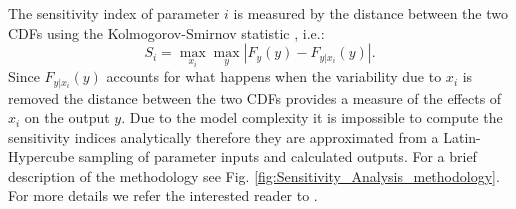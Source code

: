 \documentclass[gmd, manuscript]{copernicus}
\begin{document}
The sensitivity index of parameter $i$ is measured by the distance between the two CDFs using the Kolmogorov-Smirnov statistic 
\citep{kolmogorov1933sulla, smirnov1939estimation}, i.e.:
\begin{equation}
 S_i = \max_{x_i} \max_{y} | F_y(y) - F_{y|x_i}(y) |.
\end{equation}
Since $F_{y|x_i}(y)$ accounts for what happens when the variability due to $x_i$ is removed the distance between the two CDFs provides a measure of the effects of
$x_i$ on the output $y$. 
Due to the model complexity it is impossible to compute the sensitivity indices analytically therefore they are approximated from a Latin-Hypercube sampling of parameter 
inputs and calculated outputs.
For a brief description of the methodology see Fig. \ref{fig:Sensitivity_Analysis_methodology}. For more details we refer the interested reader to \citet{pianosi_simple_2015}. 
\end{document}
